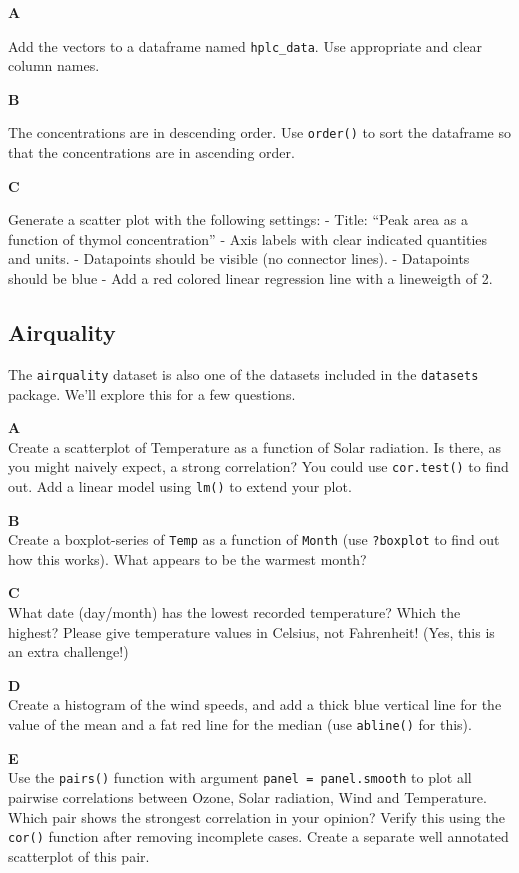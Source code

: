 \documentclass[]{book}
\begin{document}
\textbf{A}

Add the vectors to a dataframe named \texttt{hplc\_data}. Use appropriate and clear column names.

\textbf{B}

The concentrations are in descending order. Use \texttt{order()} to sort the dataframe so that the concentrations are in ascending order.

\textbf{C}

Generate a scatter plot with the following settings:
- Title: ``Peak area as a function of thymol concentration''
- Axis labels with clear indicated quantities and units.
- Datapoints should be visible (no connector lines).
- Datapoints should be blue
- Add a red colored linear regression line with a lineweigth of 2.

\hypertarget{airquality}{%
\subsection{Airquality}\label{airquality}}

The \texttt{airquality} dataset is also one of the datasets included in the \texttt{datasets} package. We'll explore this for a few questions.

\textbf{A}\\
Create a scatterplot of Temperature as a function of Solar radiation. Is there, as you might naively expect, a strong correlation? You could use \texttt{cor.test()} to find out. Add a linear model using \texttt{lm()} to extend your plot.

\textbf{B}\\
Create a boxplot-series of \texttt{Temp} as a function of \texttt{Month} (use \texttt{?boxplot} to find out how this works). What appears to be the warmest month?

\textbf{C}\\
What date (day/month) has the lowest recorded temperature? Which the highest? Please give temperature values in Celsius, not Fahrenheit! (Yes, this is an extra challenge!)

\textbf{D}\\
Create a histogram of the wind speeds, and add a thick blue vertical line for the value of the mean and a fat red line for the median (use \texttt{abline()} for this).

\textbf{E}\\
Use the \texttt{pairs()} function with argument \texttt{panel\ =\ panel.smooth} to plot all pairwise correlations between Ozone, Solar radiation, Wind and Temperature. Which pair shows the strongest correlation in your opinion? Verify this using the \texttt{cor()} function after removing incomplete cases. Create a separate well annotated scatterplot of this pair.
\end{document}
